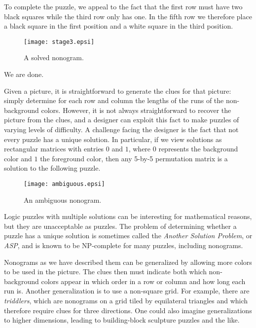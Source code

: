 \documentclass[12pt]{article}
\begin{document}
To complete the puzzle, we appeal to the fact that the first row must
have two black squares while the third row only has one.  In the fifth
row we therefore place a black square in the first position and a
white square in the third position.
\begin{figure}[hh]
\begin{center}
\texttt{[image: stage3.epsi]}
\caption{A solved nonogram.}
\end{center}
\end{figure}
We are done.

Given a picture, it is straightforward to generate the clues for that
picture: simply determine for each row and column the lengths of the
runs of the non-background colors.  However, it is not always
straightforward to recover the picture from the clues, and a designer
can exploit this fact to make puzzles of varying levels of difficulty.
A challenge facing the designer is the fact that not every puzzle has
a unique solution.  In particular, if we view solutions as rectangular
matrices with entries $0$ and $1$, where $0$ represents the background
color and $1$ the foreground color, then any 5-by-5 permutation matrix
is a solution to the following puzzle.
\begin{figure}[hh]
\begin{center}
\texttt{[image: ambiguous.epsi]}
\caption{An ambiguous nonogram.}
\end{center}
\end{figure}
Logic puzzles with multiple solutions can be interesting for
mathematical reasons, but they are unacceptable as puzzles.  The
problem of determining whether a puzzle has a unique solution is
sometimes called the \emph{Another Solution Problem}, or \emph{ASP},
and is known to be NP-complete for many puzzles, including nonograms.


Nonograms as we have described them can be generalized by allowing
more colors to be used in the picture.  The clues then must indicate
both which non-background colors appear in which order in a row or
column and how long each run is.  Another generalization is to use a
non-square grid.  For example, there are \emph{triddlers}, which are
nonograms on a grid tiled by equilateral triangles and which therefore
require clues for three directions.  One could also imagine
generalizations to higher dimensions, leading to building-block
sculpture puzzles and the like.
\end{document}
